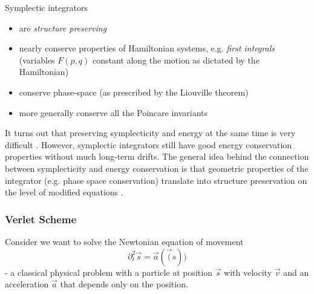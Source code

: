 Symplectic integrators

\begin{itemize}
  \item are \textit{structure preserving}
  \item nearly conserve properties of Hamiltonian systems, e.g. \textit{first integrals} (variables $F(p,q)$ constant along the motion as dictated by the Hamiltonian)
  \item conserve phase-space (as prescribed by the Liouville theorem)
  \item more generally conserve all the Poincare invariants
\end{itemize}


It turns out that preserving symplecticity and energy at the same time is very difficult \citep{Hairer06b}. However, symplectic integrators still have good energy conservation properties without much long-term drifts. The general idea behind the connection between symplecticity and energy conservation is that geometric properties of the integrator (e.g. phase space conservation) translate into structure preservation on the level of modified equations \citep[preface and chapters X through XII]{Hairer06}.



\subsubsection{Verlet Scheme}
Consider we want to solve the Newtonian equation of movement
\begin{equation}
  \partial_t^2 \vec{s} = \vec{a}(\vec(s))
\end{equation}
- a classical physical problem with a particle at position $\vec{s}$ with velocity $\vec{v}$ and an acceleration $\vec{a}$ that depends only on the position.

